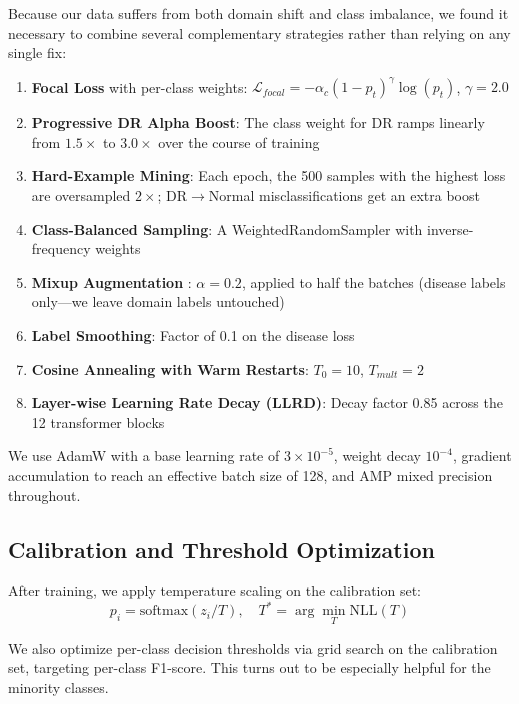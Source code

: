 \documentclass[conference]{IEEEtran}
\begin{document}
Because our data suffers from both domain shift and class imbalance, we found it necessary to combine several complementary strategies rather than relying on any single fix:

\begin{enumerate}
    \item \textbf{Focal Loss} \cite{b12} with per-class weights: $\mathcal{L}_{focal} = -\alpha_c(1-p_t)^\gamma \log(p_t)$, $\gamma=2.0$
    \item \textbf{Progressive DR Alpha Boost}: The class weight for DR ramps linearly from $1.5\times$ to $3.0\times$ over the course of training
    \item \textbf{Hard-Example Mining}: Each epoch, the 500 samples with the highest loss are oversampled $2\times$; DR$\rightarrow$Normal misclassifications get an extra boost
    \item \textbf{Class-Balanced Sampling}: A WeightedRandomSampler with inverse-frequency weights
    \item \textbf{Mixup Augmentation} \cite{b11}: $\alpha=0.2$, applied to half the batches (disease labels only---we leave domain labels untouched)
    \item \textbf{Label Smoothing}: Factor of 0.1 on the disease loss
    \item \textbf{Cosine Annealing with Warm Restarts}: $T_0=10$, $T_{mult}=2$
    \item \textbf{Layer-wise Learning Rate Decay (LLRD)}: Decay factor 0.85 across the 12 transformer blocks
\end{enumerate}

\noindent We use AdamW \cite{b25} with a base learning rate of $3\times10^{-5}$, weight decay $10^{-4}$, gradient accumulation to reach an effective batch size of 128, and AMP mixed precision throughout.

\subsection{Calibration and Threshold Optimization}

After training, we apply temperature scaling on the calibration set:
\begin{equation}
p_i = \text{softmax}(z_i / T), \quad T^* = \arg\min_T \text{NLL}(T)
\end{equation}

We also optimize per-class decision thresholds via grid search on the calibration set, targeting per-class F1-score. This turns out to be especially helpful for the minority classes.
\end{document}
